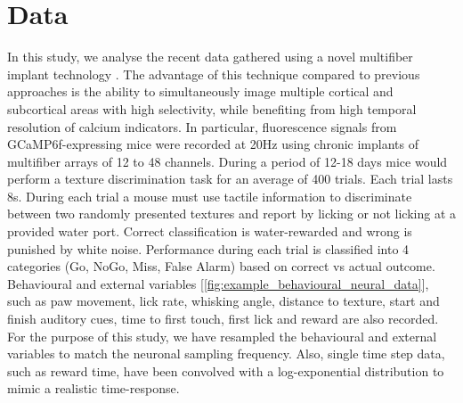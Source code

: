 \documentclass[a4paper,10pt]{article}
\begin{document}
\section{Data}
In this study, we analyse the recent data gathered using a novel multifiber implant technology \cite{sych_high_density_2019}. The advantage of this technique compared to previous approaches is the ability to simultaneously image multiple cortical and subcortical areas with high selectivity, while benefiting from high temporal resolution of calcium indicators. In particular, fluorescence signals from GCaMP6f-expressing mice were recorded at 20Hz using chronic implants of multifiber arrays of 12 to 48 channels. During a period of 12-18 days mice would perform a texture discrimination task for an average of 400 trials. Each trial lasts 8s. During each trial a mouse must use tactile information to discriminate between two randomly presented textures and report by licking or not licking at a provided water port. Correct classification is water-rewarded and wrong is punished by white noise. Performance during each trial is classified into 4 categories (Go, NoGo, Miss, False Alarm) based on correct vs actual outcome. Behavioural and external variables [\cref{fig:example_behavioural_neural_data}], such as paw movement, lick rate, whisking angle, distance to texture, start and finish auditory cues, time to first touch, first lick and reward are also recorded. For the purpose of this study, we have resampled the behavioural and external variables to match the neuronal sampling frequency. Also, single time step data, such as reward time, have been convolved with a log-exponential distribution to mimic a realistic time-response.
\end{document}
